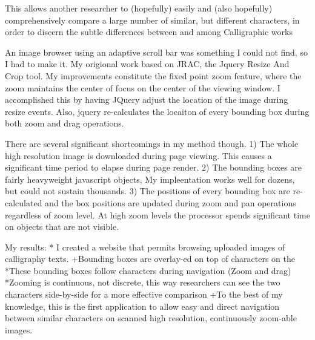                 This allows another researcher to (hopefully) easily and (also hopefully) comprehensively compare a large number of similar, but different characters, in order to discern the subtle differences between and among Calligraphic works
                
                An image browser using an adaptive scroll bar was something I could not find, so I had to make it.  My origional work based on JRAC, the Jquery Resize And Crop tool.  My improvements constitute the fixed point zoom feature, where the zoom maintains the center of focus on the center of the viewing window.  I accomplished this by having JQuery adjust the location of the image during resize events.  Also, jquery re-calculates the locaiton of every bounding box during both zoom and drag operations.
                
                There are several significant shortcomings in my method though.
                1)  The whole high resolution image is downloaded during page viewing. This causes a significant time period to elapse during page render.
                2)  The bounding boxes are fairly heavyweight javascript objects, My impleentation works well for dozens, but could not sustain thousands.
                3)  The positions of every bounding box are re-calculated and the box positions are updated during zoom and pan operations regardless of zoom level.  At high zoom levels the processor spends significant time on objects that are not visible.
                
                
                    My results:
        *  I created a website that permits browsing uploaded images of calligraphy texts.
            +Bounding boxes are overlay-ed on top of characters on the 
                *These bounding boxes follow characters during navigation (Zoom and drag)
                *Zooming is continuous, not discrete, this way researchers can see the two characters side-by-side for a more effective comparison
            +To the best of my knowledge, this is the first application to allow easy and direct navigation between similar characters on scanned high resolution, continuously zoom-able images.
